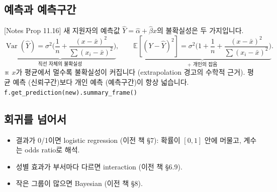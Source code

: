 \documentclass[11pt,a4paper]{article}
\newcommand{\E}{\mathbb{E}}
\newcommand{\Var}{\operatorname{Var}}
\newcommand{\code}[1]{\texttt{#1}}
\newcommand{\nref}[1]{{\footnotesize\textsf{\color{blue!55!black}[Notes #1]}}}
\newcommand{\aside}[1]{{\footnotesize\color{black!65}#1}}
\begin{document}
\subsection{예측과 예측구간} \nref{Prop 11.16}
새 지원자의 예측값 $\hat Y=\hat\alpha+\hat\beta x$의 불확실성은 두 가지입니다.
\[
\underbrace{\Var(\hat Y)=\sigma^2\Big(\frac1n+\frac{(x-\bar x)^2}{\sum(x_i-\bar x)^2}\Big)}_{\text{직선 자체의 불확실성}},\qquad
\underbrace{\E[(Y-\hat Y)^2]=\sigma^2\Big(1+\frac1n+\frac{(x-\bar x)^2}{\sum(x_i-\bar x)^2}\Big)}_{\text{+ 개인의 잡음}}.
\]
\aside{※ $x$가 평균에서 멀수록 불확실성이 커집니다 (extrapolation 경고의 수학적 근거). 평균 예측 (신뢰구간)보다 개인 예측 (예측구간)이 항상 넓습니다. \code{f.get\_prediction(new).summary\_frame()}}

\subsection{회귀를 넘어서}
\begin{itemize}
\item 결과가 0/1이면 logistic regression (이전 책 §7): 확률이 $[0,1]$ 안에 머물고, 계수는 odds ratio로 해석.
\item 성별 효과가 부서마다 다르면 interaction (이전 책 §6.9).
\item 작은 그룹이 많으면 Bayesian (이전 책 §8).
\end{itemize}

\end{document}
